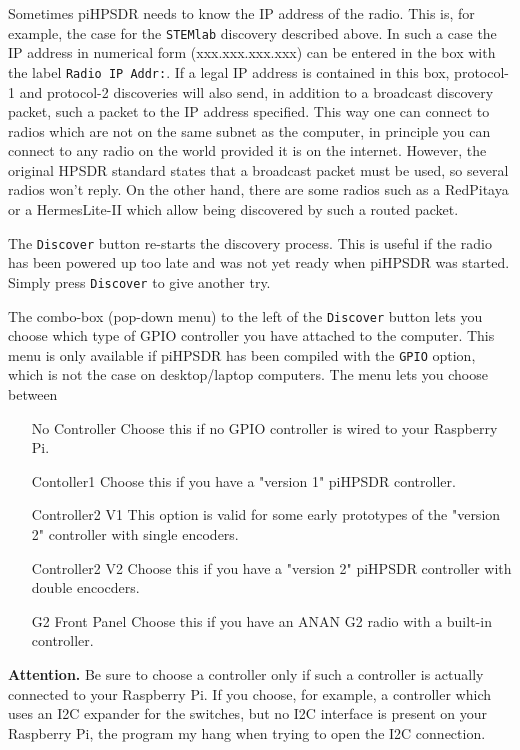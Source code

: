\documentclass[12pt]{book}
\def\rett#1{\texttt{\color{red}#1}}
\begin{document}
Sometimes piHPSDR needs to know the IP address of the radio. This is, for example, the case for the \texttt{STEMlab} discovery
described above. In such a case the IP address in numerical form (xxx.xxx.xxx.xxx) can be entered in the box
with the label \rett{Radio IP Addr:}. If a legal IP address is contained in this box, protocol-1 and protocol-2 discoveries
will also send, in addition to a broadcast discovery packet, such a packet to the IP address specified. This way one can
connect to radios which are not on the same subnet as the computer, in principle you can connect to any radio on the world
provided it is on the internet. However, the original HPSDR standard states that a broadcast packet must be used, so several
radios won't reply. On the other hand, there are some radios such as a RedPitaya or a HermesLite-II which allow being discovered
by such a routed packet. 

The \rett{Discover} button re-starts the discovery process. This is useful if the radio has been powered up too late and
was not yet ready when piHPSDR was started. Simply press \rett{Discover} to give another try.

The combo-box (pop-down menu) to the left of the \rett{Discover} button lets you choose which type of GPIO controller you
have attached to the computer. This menu is only available if piHPSDR has been compiled with the \texttt{GPIO} option, which
is not the case on desktop/laptop computers. The menu lets you choose between

\begin{itemize}[font=\texttt, left=80pt]
\item[No Controller]{Choose this if no GPIO controller is wired to your Raspberry Pi.}
\item[Contoller1]{Choose this if you have a "version 1" piHPSDR controller.}
\item[Controller2 V1]{This option is valid for some early prototypes of the "version 2" controller with single encoders.}
\item[Controller2 V2]{Choose this if you have a "version 2" piHPSDR controller with double encocders.}
\item[G2 Front Panel]{Choose this if you have an ANAN G2 radio with a built-in controller.}
\end{itemize}

\textbf{Attention.} Be sure to choose a controller only if such a controller is actually connected to your Raspberry Pi. If
you choose, for example, a controller which uses an I2C expander for the switches, but no I2C interface is present on
your Raspberry Pi, the program my hang when trying to open the I2C connection.
\end{document}
